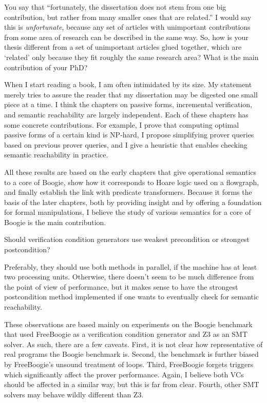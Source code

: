 \Q You say that ``fortunately, the dissertation does not stem from one big
contribution, but rather from many smaller ones that are related.'' I would
say this is {\it unfortunate}, because any set of articles with unimportant
contributions from some area of research can be described in the same way.
So, how is your thesis different from a set of unimportant articles glued
together, which are `related' only because they fit roughly the same
research area? What is the main contribution of your PhD?

\A When I start reading a book, I am often intimidated by its size.  My
statement merely tries to assure the reader that my dissertation may be
digested one small piece at a time. I think the chapters on passive forms,
incremental verification, and semantic reachability are largely
independent. Each of these chapters has some concrete contributions.  For
example, I prove that computing optimal passive forms of a certain kind is
NP-hard, I propose simplifying prover queries based on previous prover
queries, and I give a heuristic that enables checking semantic reachability
in practice.

All these results are based on the early chapters that give operational
semantics to a core of Boogie, show how it corresponds to Hoare logic used
on a flowgraph, and finally establish the link with predicate transformers.
Because it forms the basis of the later chapters, both by providing insight
and by offering a foundation for formal manipulations, I believe the study
of various semantics for a core of Boogie is the main contribution.


\Q Should verification condition generators use weakest precondition or
strongest postcondition?

\A Preferably, they should use both methods in parallel, if the machine has
at least two processing units. Otherwise, there doesn't seem to be much
difference from the point of view of performance, but it makes sense to
have the strongest postcondition method implemented if one wants to
eventually check for semantic reachability.

These observations are based mainly on experiments on the Boogie benchmark
that used FreeBoogie as a verification condition generator and Z3 as an SMT
solver. As such, there are a few caveats. First, it is not clear how
representative of real programs the Boogie benchmark is. Second, the
benchmark is further biased by FreeBoogie's unsound treatment of loops.
Third, FreeBoogie forgets triggers which significantly affect the prover
performance. Again, I believe both VCs should be affected in a similar way,
but this is far from clear.  Fourth, other SMT solvers may behave wildly
different than Z3.

